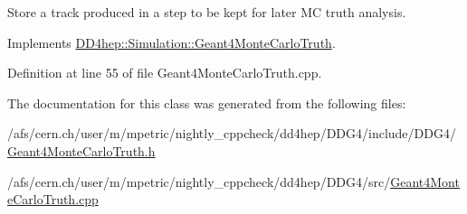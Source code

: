 Store a track produced in a step to be kept for later MC truth analysis. 



Implements \hyperlink{class_d_d4hep_1_1_simulation_1_1_geant4_monte_carlo_truth_aaa3fb07338363616c0a898d791d24314}{D\+D4hep\+::\+Simulation\+::\+Geant4\+Monte\+Carlo\+Truth}.



Definition at line 55 of file Geant4\+Monte\+Carlo\+Truth.\+cpp.



The documentation for this class was generated from the following files\+:\begin{DoxyCompactItemize}
\item 
/afs/cern.\+ch/user/m/mpetric/nightly\+\_\+cppcheck/dd4hep/\+D\+D\+G4/include/\+D\+D\+G4/\hyperlink{_geant4_monte_carlo_truth_8h}{Geant4\+Monte\+Carlo\+Truth.\+h}\item 
/afs/cern.\+ch/user/m/mpetric/nightly\+\_\+cppcheck/dd4hep/\+D\+D\+G4/src/\hyperlink{_geant4_monte_carlo_truth_8cpp}{Geant4\+Monte\+Carlo\+Truth.\+cpp}\end{DoxyCompactItemize}
